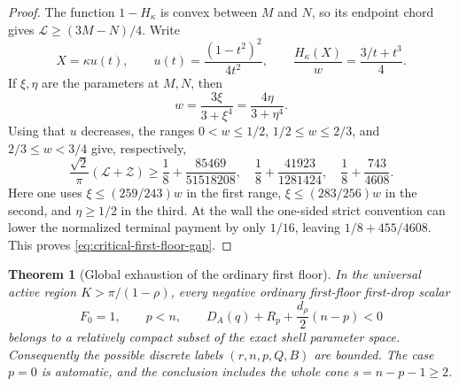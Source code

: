 \documentclass[11pt]{article}
\newtheorem{theorem}{Theorem}[section]
\theoremstyle{remark}
\begin{document}
\begin{proof}
The function $1-H_\kappa$ is convex between $M$ and $N$, so its endpoint
chord gives $\mathcal L\geq(3M-N)/4$.  Write
\[
 X=\kappa u(t),\qquad
 u(t)=\frac{(1-t^2)^2}{4t^2},\qquad
 \frac{H_\kappa(X)}w=\frac{3/t+t^3}{4}.
\]
If $\xi,\eta$ are the parameters at $M,N$, then
\[
 w=\frac{3\xi}{3+\xi^4}=\frac{4\eta}{3+\eta^4}.
\]
Using that $u$ decreases, the ranges
$0<w\leq1/2$, $1/2\leq w\leq2/3$, and $2/3\leq w<3/4$ give,
respectively,
\[
 \frac{\sqrt2}{\pi}(\mathcal L+\mathcal Z)
 \geq\frac18+\frac{85469}{51518208},\quad
 \frac18+\frac{41923}{1281424},\quad
 \frac18+\frac{743}{4608}.
\]
Here one uses $\xi\leq(259/243)w$ in the first range,
$\xi\leq(283/256)w$ in the second, and $\eta\geq1/2$ in the third.
At the wall the one-sided strict convention can lower the normalized
terminal payment by only $1/16$, leaving $1/8+455/4608$.  This proves
\eqref{eq:critical-first-floor-gap}.
\end{proof}

\begin{theorem}[Global exhaustion of the ordinary first floor]
\label{thm:first-floor-global-exhaustion}
In the universal active region $K>\pi/(1-\rho)$, every negative
ordinary first-floor first-drop scalar
\[
 F_0=1,\qquad p<n,\qquad
 D_A(q)+R_p+\frac{d_\rho}{2}(n-p)<0
\]
belongs to a relatively compact subset of the exact shell parameter
space.  Consequently the possible discrete labels $(r,n,p,Q,B)$ are
bounded.  The case $p=0$ is automatic, and the conclusion includes the
whole cone $s=n-p-1\geq2$.
\end{theorem}
\end{document}
